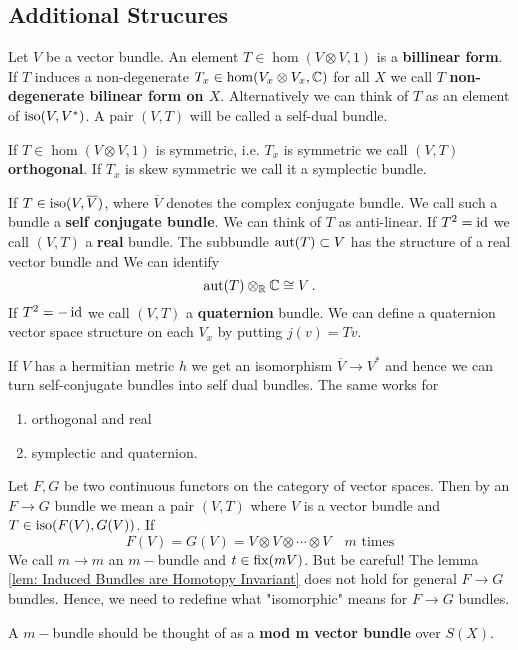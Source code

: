 \subsection{Additional Strucures}
\begin{definition}
	Let $V$ be a vector bundle. An element $T\in \hom(V\otimes V,1)$ is a \textbf{billinear form}. 
	If $T$ induces a non-degenerate $T_x\in \hom(V_x\otimes V_x,\mathbb{C})$ for all $X$ we call $T$ \textbf{non-degenerate bilinear form on $X$}. Alternatively we can think of $T$ as an element of $\mathrm{iso}(V,V^*)$. A pair $(V,T)$ will be called a self-dual bundle.
\end{definition}
\begin{definition}
	If $T\in \hom(V\otimes V,1)$ is symmetric, i.e. $T_x$ is symmetric we call $(V,T)$ \textbf{orthogonal}. If $T_x$ is skew symmetric we call it a symplectic bundle.
\end{definition}
\begin{definition}
	If $T\in \mathrm{iso}(V,\overline{V})$, where $\overline{V}$ denotes the complex conjugate bundle. We call such a bundle a \textbf{self conjugate bundle}. We can think of $T$ as anti-linear. If $T^2= \operatorname{\text{id}}$ we call $(V,T)$ a \textbf{real} bundle. The subbundle  $\operatorname{\mathrm{aut}}(T)\subset V$ has the structure of a real vector bundle and We can identify 
	\begin{equation*}
		\operatorname{\mathrm{aut}}(T)\otimes_{\mathbb{R}} \mathbb{C} \cong V\, .
	\end{equation*} If $T^2=-\operatorname{\text{id}}$ we call $(V,T)$ a \textbf{quaternion} bundle. We can define a quaternion vector space structure on each $V_x$ by putting $j(v)=Tv$. 
\end{definition}
\begin{lemma}
	If $V$ has a hermitian metric $h$ we get an isomorphism $\overline{V}\to V^*$ and hence we can turn self-conjugate bundles into self dual bundles. The same works for 
	\begin{enumerate}
		\item orthogonal and real
		\item symplectic and quaternion.
	\end{enumerate}
\end{lemma}
\begin{definition}
	Let $F,G$ be two continuous functors on the category of vector spaces. Then by an $F\to G$ bundle we mean a pair $(V,T)$ where $V$ is a vector bundle and $T\in \mathrm{iso}(F(V),G(V))$.
	If 
	\begin{equation*}
		F(V)=G(V)=V\otimes V\otimes \cdots \otimes V \quad \text{$m$ times}
	\end{equation*}
	We call $m\to m$ an $m-$bundle and $t\in \operatorname{\mathrm{fix}}(mV)$. But be careful! The lemma \ref{lem: Induced Bundles are Homotopy Invariant} does not hold for general $F\to G$ bundles. Hence, we need to redefine what 
	"isomorphic"  means for $F\to G$ bundles.
\end{definition}
\begin{remark}
	A $m-$bundle should be thought of as a \textbf{mod m vector bundle} over $S(X)$. 
\end{remark}
